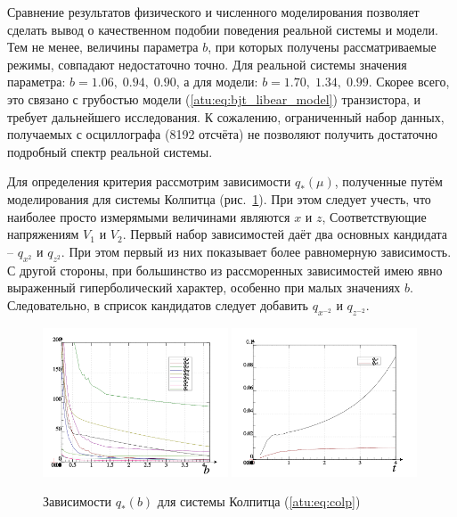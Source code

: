 \documentclass[a4paper,12pt]{article}
\begin{document}
Сравнение результатов физического и численного моделирования позволяет сделать вывод
о качественном подобии поведения реальной системы и модели.
Тем не менее, величины параметра $b$, при которых получены
рассматриваемые режимы, совпадают недостаточно точно.
Для реальной системы значения параметра: $b = 1.06, \; 0.94, \; 0.90 $,
а для модели: $b = 1.70, \; 1.34, \; 0.99 $.
Скорее всего, это связано с грубостью модели (\ref{atu:eq:bjt_libear_model}) транзистора,
и требует дальнейшего исследования.
К сожалению, ограниченный набор данных, получаемых с осциллографа (8192 отсчёта) не позволяют
получить достаточно подробный спектр реальной системы.

Для определения критерия рассмотрим зависимости
$q_{*}(\mu) $, полученные путём моделирования
для системы Колпитца (рис.~\ref{atu:f:colp_q}).
При этом следует учесть, что наиболее просто измерямыми величинами являются $x$ и $z$,
Соответствующие напряжениям $V_1$ и $V_2$.
Первый набор зависимостей даёт два основных кандидата -- $q_{x^2}$ и $q_{z^2}$.
При этом первый из них показывает более равномерную зависимость.
С другой стороны, при большинство из рассморенных зависимостей имею явно
выраженный гиперболический характер, особенно при малых значениях $b$.
Следовательно, в сприсок кандидатов следует добавить $q_{x^{-2}} $ и $q_{z^{-2}}$.

\begin{figure}[htb!]
\centerline{
  \includegraphics[width=0.49\textwidth]{p/cha/colp/colp_p-p_b_e.png}
  \includegraphics[width=0.49\textwidth]{p/cha/colp/colp_p-p_b_1ex2.png}
}
  \caption{Зависимости $q_{*}(b) $ для системы Колпитца (\ref{atu:eq:colp})}
\label{atu:f:colp_q}
\end{figure}
\end{document}
